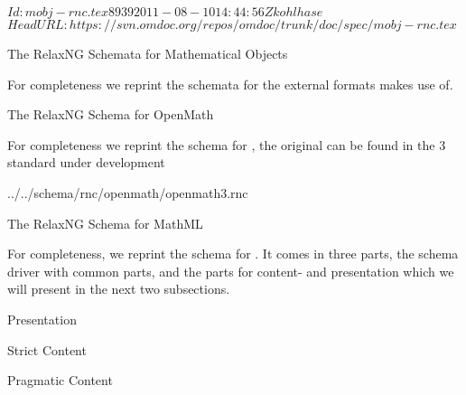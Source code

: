 \svnInfo $Id: mobj-rnc.tex 8939 2011-08-10 14:44:56Z kohlhase $
\svnKeyword $HeadURL: https://svn.omdoc.org/repos/omdoc/trunk/doc/spec/mobj-rnc.tex $

\begin{omgroup}[id=mobj-rnc]{The RelaxNG Schemata for Mathematical Objects}

For completeness we reprint the {\relaxng} schemata for the external formats
{\omdoc} makes use of.

\begin{omgroup}[id=rnc.openm]{The RelaxNG Schema for OpenMath}

For completeness we reprint the {\relaxng} schema for {\openmath}, the original can be
found in the {\openmath}3 standard under development


{../../schema/rnc/openmath/openmath3.rnc}
\end{omgroup}

\begin{omgroup}[id=rnc.mathml]{The RelaxNG Schema for MathML}

For completeness, we reprint the {\relaxng} schema for {\mathml}. It comes in three parts,
the schema driver with common parts, and the parts for content- and presentation {\mathml} which we will
present in the next two subsections.



\end{omgroup}

\begin{omgroup}[id=rnc.pmathml]{Presentation {\mathml}}

\end{omgroup}

\begin{omgroup}[id=rnc.cmathml]{Strict Content {\mathml}}
  
\end{omgroup}

\begin{omgroup}[id=rnc.cmathml]{Pragmatic Content {\mathml}}
  
\end{omgroup}
\end{omgroup}



